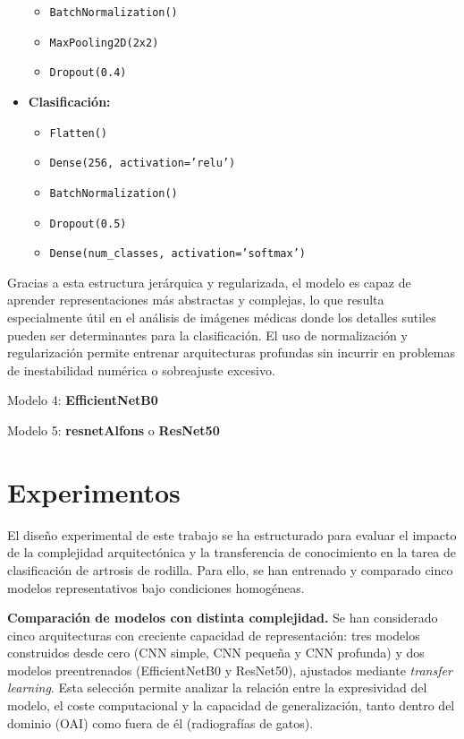 \documentclass[11pt,spanish,listoffigures,listoftables]{tfgetsinf}
\begin{document}
\begin{itemize}
\begin{itemize}
        \item \texttt{BatchNormalization()}
        \item \texttt{MaxPooling2D(2x2)}
        \item \texttt{Dropout(0.4)}
    \end{itemize}
    \item \textbf{Clasificación:}
    \begin{itemize}
        \item \texttt{Flatten()}
        \item \texttt{Dense(256, activation='relu')}
        \item \texttt{BatchNormalization()}
        \item \texttt{Dropout(0.5)}
        \item \texttt{Dense(num\_classes, activation='softmax')}
    \end{itemize}
\end{itemize}

Gracias a esta estructura jerárquica y regularizada, el modelo es capaz de aprender representaciones 
más abstractas y complejas, lo que resulta especialmente útil en el análisis de imágenes médicas donde 
los detalles sutiles pueden ser determinantes para la clasificación. El uso de normalización y regularización 
permite entrenar arquitecturas profundas sin incurrir en problemas de inestabilidad numérica o sobreajuste excesivo.


Modelo 4: \textbf{EfficientNetB0} 

Modelo 5: \textbf{resnetAlfons} o \textbf{ResNet50}

\section{Experimentos}

El diseño experimental de este trabajo se ha estructurado para evaluar el impacto de la complejidad arquitectónica y la transferencia de conocimiento 
en la tarea de clasificación de artrosis de rodilla. Para ello, se han entrenado y comparado cinco modelos representativos bajo condiciones homogéneas.

\textbf{Comparación de modelos con distinta complejidad.}
Se han considerado cinco arquitecturas con creciente capacidad de representación: tres modelos construidos desde cero (CNN simple, CNN pequeña y CNN profunda) 
y dos modelos preentrenados (EfficientNetB0 y ResNet50), ajustados mediante \textit{transfer learning}. Esta selección permite analizar la relación entre la 
expresividad del modelo, el coste computacional y la capacidad de generalización, tanto dentro del dominio (OAI) como fuera de él (radiografías de gatos).
\end{document}
